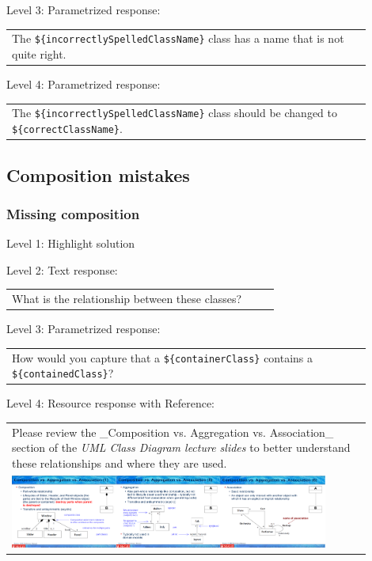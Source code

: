 \noindent Level 3: Parametrized response: \medskip

\begin{tabular}{|p{0.9\linewidth}}
The \verb|${incorrectlySpelledClassName}| class has a name that is not quite right.
\end{tabular} \medskip

\noindent Level 4: Parametrized response: \medskip

\begin{tabular}{|p{0.9\linewidth}}
The \verb|${incorrectlySpelledClassName}| class should be changed to \verb|${correctClassName}|.
\end{tabular} \medskip



\subsection{Composition mistakes}

\subsubsection{Missing composition}

\noindent Level 1: Highlight solution \medskip

\noindent Level 2: Text response: \medskip

\begin{tabular}{|p{0.9\linewidth}}
What is the relationship between these classes?
\end{tabular} \medskip

\noindent Level 3: Parametrized response: \medskip

\begin{tabular}{|p{0.9\linewidth}}
How would you capture that a \verb|${containerClass}| contains a \verb|${containedClass}|?
\end{tabular} \medskip

\noindent Level 4: Resource response with Reference: \medskip

\begin{tabular}{|p{0.9\linewidth}}
Please review the _Composition vs. Aggregation vs. Association_ section of 
the \textit{UML Class Diagram lecture slides} to 
better understand these relationships and where they are used.

\\
\includegraphics[width=0.9\textwidth]{images/composition_aggregation_association.png}
\end{tabular} \medskip


